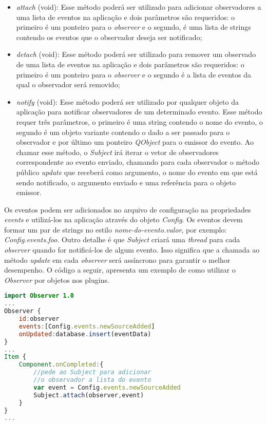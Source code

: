 \begin{itemize}
	\item \textit{attach} (void): Esse método poderá ser utilizado para adicionar observadores a uma lista de eventos na aplicação e dois parâmetros são requeridos: o primeiro é um ponteiro para o \textit{observer} e o segundo, é uma lista de strings contendo os eventos que o observador deseja ser notificado;

	\item \textit{detach} (void): Esse método poderá ser utilizado para remover um observado de uma lista de eventos na aplicação e dois parâmetros são requeridos: o primeiro é um ponteiro para o \textit{observer} e o segundo é a lista de eventos da qual o observador será removido;

	\item \textit{notify} (void): Esse método poderá ser utilizado por qualquer objeto da aplicação para notificar observadores de um determinado evento. Esse método requer três parâmetros, o primeiro é uma string contendo o nome do evento, o segundo é um objeto variante contendo o dado a ser passado para o observador e por último um ponteiro \textit{QObject} para o emissor do evento. Ao chamar esse método, o \textit{Subject} irá iterar o vetor de observadores correspondente ao evento enviado, chamando para cada observador o método público \textit{update} que receberá como argumento, o nome do evento em que está sendo notificado, o argumento enviado e uma referência para o objeto emissor.
\end{itemize}

Os eventos podem ser adicionados no arquivo de configuração na propriedades \textit{events} e utilizá-los na aplicação através do objeto \textit{Config}. Os eventos devem formar um par de strings no estilo \textit{nome-do-evento.valor}, por exemplo: \textit{Config.events.foo}. Outro detalhe é que \textit{Subject} criará uma \textit{thread} para cada \textit{observer} quando for notificá-los de algum evento. Isso significa que a chamada ao método \textit{update} em cada \textit{observer} será assíncrono para garantir o melhor desempenho. O código a seguir, apresenta um exemplo de como utilizar o \textit{Observer} por objetos nos plugins.

\begin{center}
\begin{lstlisting}[language=qml]
import Observer 1.0
...
Observer {
	id:observer
	events:[Config.events.newSourceAdded]
	onUpdated:database.insert(eventData)
}
...
Item {
	Component.onCompleted:{
		//pede ao Subject para adicionar
		//o observador a lista do evento
		var event = Config.events.newSourceAdded
		Subject.attach(observer,event)
	}
}
...
\end{lstlisting}
\end{center}


